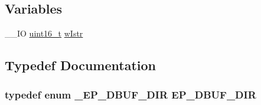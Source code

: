 \subsection*{Variables}
\begin{DoxyCompactItemize}
\item 
\-\_\-\-\_\-\-I\-O \hyperlink{stdint_8h_a273cf69d639a59973b6019625df33e30}{uint16\-\_\-t} \hyperlink{_s_t_m32_f10x_2_libraries_2_s_t_m32___u_s_b-_f_s-_device___driver_2inc_2usb__regs_8h_ada56371c653397fdfcb0bd55b7484071}{w\-Istr}
\end{DoxyCompactItemize}


\subsection{Typedef Documentation}
\hypertarget{_s_t_m32_f10x_2_libraries_2_s_t_m32___u_s_b-_f_s-_device___driver_2inc_2usb__regs_8h_abece26f40c007d1794916066fa950085}{
\subsubsection[{E\-P\-\_\-\-D\-B\-U\-F\-\_\-\-D\-I\-R}]{\setlength{\rightskip}{0pt plus 5cm}typedef enum {\bf \-\_\-\-E\-P\-\_\-\-D\-B\-U\-F\-\_\-\-D\-I\-R} {\bf E\-P\-\_\-\-D\-B\-U\-F\-\_\-\-D\-I\-R}}}\label{_s_t_m32_f10x_2_libraries_2_s_t_m32___u_s_b-_f_s-_device___driver_2inc_2usb__regs_8h_abece26f40c007d1794916066fa950085}


